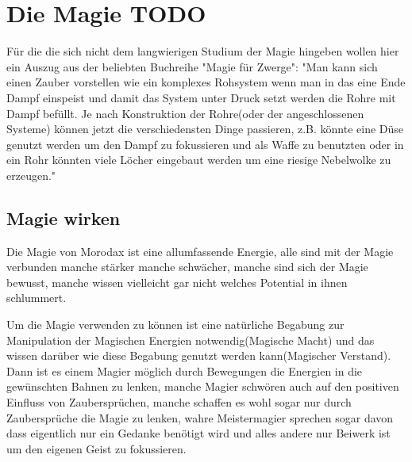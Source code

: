 \chapter{Die Magie TODO}
Für die die sich nicht dem langwierigen Studium der Magie hingeben wollen hier ein Auszug aus der beliebten Buchreihe "Magie für Zwerge": "Man kann sich einen Zauber vorstellen wie ein komplexes Rohsystem wenn man in das eine Ende Dampf einspeist und damit das System unter Druck setzt werden die Rohre mit Dampf befüllt. Je nach Konstruktion der Rohre(oder der angeschlossenen Systeme) können jetzt die verschiedensten Dinge passieren, z.B. könnte eine Düse genutzt werden um den Dampf zu fokussieren und als Waffe zu benutzten oder in ein Rohr könnten viele Löcher eingebaut werden um eine riesige Nebelwolke zu erzeugen."

\section{Magie wirken}
Die Magie von Morodax ist eine allumfassende Energie, alle sind mit der Magie verbunden manche stärker manche schwächer, manche sind sich der Magie bewusst, manche wissen vielleicht gar nicht welches Potential in ihnen schlummert.

Um die Magie verwenden zu können ist eine natürliche Begabung zur Manipulation der Magischen Energien notwendig(Magische Macht) und das wissen darüber wie diese Begabung genutzt werden kann(Magischer Verstand). Dann ist es einem Magier möglich durch Bewegungen die Energien in die gewünschten Bahnen zu lenken, manche Magier schwören auch auf den positiven Einfluss von Zaubersprüchen, manche schaffen es wohl sogar nur durch Zaubersprüche die Magie zu lenken, wahre Meistermagier sprechen sogar davon dass eigentlich nur ein Gedanke benötigt wird und alles andere nur Beiwerk ist um den eigenen Geist zu fokussieren.

